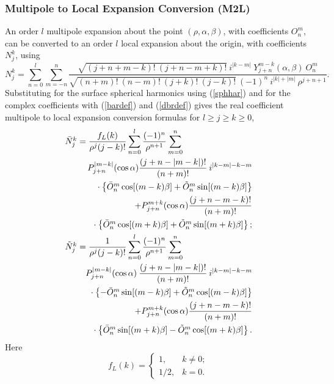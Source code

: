 \subsubsection{Multipole to Local Expansion Conversion (M2L)}

An order $l$ multipole expansion about the point
$(\rho, \alpha, \beta)$,
with coefficients $O_n^m$, can be converted to an order $l$ local
expansion about the origin, with coefficients $N_j^k$, using
\begin{equation}
N_j^k = \sum_{n=0}^l\sum_{m=-n}^n\frac{\sqrt{(j+n+m-k)!\:(j+n-m+k)!}\:i^{|k-m|}\:Y_{j+n}^{m-k}(\alpha, \beta)\:O_n^m}{\sqrt{(n+m)!\:(n-m)!\:(j+k)!\:(j-k)!}\:(-1)^n\:i^{|k|+|m|}\:\rho^{j+n+1}}.
\end{equation}
Substituting for the surface
spherical harmonics using (\ref{sphhar}) and for the
complex coefficients with (\ref{bardef}) and (\ref{dbrdef}) gives the real
coefficient multipole to local expansion conversion formulas for
$l\geq j\geq k\geq 0$,
\begin{eqnarray}
\lefteqn{\Nb{j}{k}=
\frac{f_{L}(k)}{\rho^j(j-k)!}
\sum_{n=0}^l\frac{(-1)^n}{\rho^{n+1}}\sum_{m=0}^n}\nonumber\\
&&P_{j+n}^{|m-k|}(\cos\alpha)\frac{(j+n-|m-k|)!}{(n+m)!}\:i^{|k-m|-k-m}
\nonumber\\
&&\rule{0.25in}{0in}\cdot\left\{\Ob{n}{m}\cos[(m-k)\beta]+\Obb{n}{m}\sin[(m-k)\beta]\right\}\nonumber\\
&&+P_{j+n}^{m+k}(\cos\alpha)\frac{(j+n-m-k)!}{(n+m)!}\nonumber\\
&&\rule{0.25in}{0in}\cdot\left\{\Ob{n}{m}\cos[(m+k)\beta]+\Obb{n}{m}\sin[(m+k)\beta]\right\};
\\
\lefteqn{\Nbb{j}{k}=
\frac{1}{\rho^j(j-k)!}
\sum_{n=0}^l\frac{(-1)^n}{\rho^{n+1}}\sum_{m=0}^n}\nonumber \\
&&P_{j+n}^{|m-k|}(\cos\alpha)\:\frac{(j+n-|m-k|)!}{(n+m)!}\:i^{|k-m|-k-m}\nonumber\\
&&\rule{0.25in}{0in}\cdot\left\{-\Ob{n}{m}\sin[(m-k)\beta]+\Obb{n}{m}\cos[(m-k)\beta]\right\}\nonumber\\
&&+P_{j+n}^{m+k}(\cos\alpha)\frac{(j+n-m-k)!}{(n+m)!}\nonumber\\
&&\rule{0.25in}{0in}\cdot\left\{\Ob{n}{m}\sin[(m+k)\beta]-\Obb{n}{m}\cos[(m+k)\beta]\right\}.
\end{eqnarray}
Here
\begin{equation}
f_{L}(k) = \left\{
\begin{array}{ll}
1,&k\neq 0;\\
1/2,&k=0.
\end{array}\right.
\label{fm2ldef}
\end{equation}

